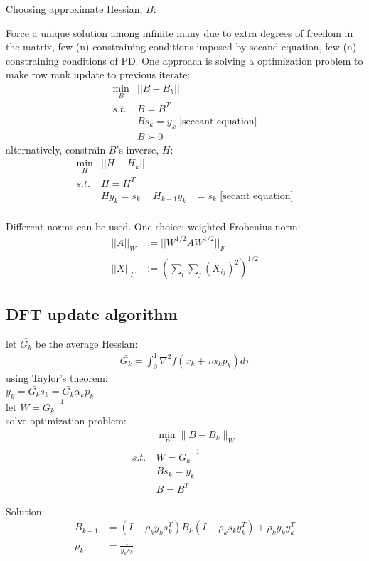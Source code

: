 \documentclass[8pt,letter]{article}
\begin{document}
\begin{multicols*}{2}
  Choosing approximate Hessian, $B$:
  
  Force a unique solution among infinite many due to extra degrees of freedom in the matrix, few (n) constraining conditions imposed by secand equation, few (n) constraining conditions of PD. One approach is solving a optimization problem to make row rank update to previous iterate:
  \begin{align*}
    \min_B & ||B-B_k||\\
    s.t.\ &B=B^T \\
    &Bs_k=y_k \text{ [seccant equation]}\\
    &B \succ 0
  \end{align*}
  alternatively, constrain $B$'s inverse, $H$:
  \begin{align*}
    \min_H & ||H-H_k||\\
    s.t.\ &H=H^T\\
    &Hy_k=s_k
    &H_{k+1}y_k & = s_k \text{ [secant equation]}\\
  \end{align*}
  
  Different norms can be used. One choice: weighted Frobenius norm:
  \begin{align*}
    ||A||_W & := ||W^{1/2}AW^{1/2}||_F\\
    ||X||_F & := (\sum_i \sum_j (X_{ij})^2)^{1/2}
  \end{align*}

  \subsection{DFT update algorithm}
  let $\bar{G_k}$ be the average Hessian:
  \begin{align*}
    \bar{G_k} = \int_0^1 \nabla^2 f(x_k + \tau \alpha_k p_k) d \tau
  \end{align*}
  using Taylor's theorem:\\
  $y_k = \bar{G_k} s_k = \bar{G_k} \alpha_k p_k$\\
  let $W=\bar{G_k}^{-1}$\\
  solve optimization problem:
  \begin{align*}
    &\min_B \| B - B_k \|_W\\
    s.t.\ &W=\bar{G_k}^{-1}\\
    &Bs_k=y_k\\
    &B=B^T
  \end{align*}
  
  Solution:
  \begin{align*}
    B_{k+1} &= (I-\rho_k y_k s_k^T)B_k(I - \rho_k s_k y_k^T) + \rho_k y_k y_k^T\\
    \rho_k &= \frac{1}{y_k s_k}
  \end{align*}


\end{multicols*}
\end{document}
